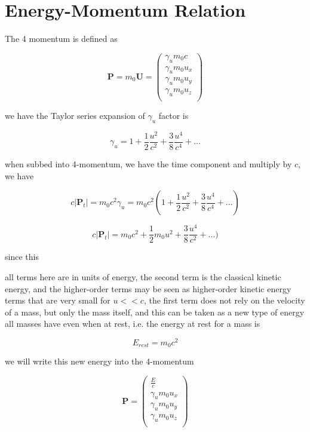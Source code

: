 \section{Energy-Momentum Relation}

The 4 momentum is defined as

\begin{equation}
	\mathbf{P} = m_0 \mathbf{U} =
	\begin{pmatrix}
		\gamma_u m_0 c   \\
		\gamma_u m_0 u_x \\
		\gamma_u m_0 u_y \\
		\gamma_u m_0 u_z \\
	\end{pmatrix}
\end{equation}

we have the Taylor series expansion of $\gamma_u$ factor is

\begin{equation}
	\gamma_u = 1 + \frac{1}{2}\frac{u^2}{c^2} + \frac{3}{8}\frac{u^4}{c^4} + ...
\end{equation}

when subbed into 4-momentum, we have the time component and multiply by $c$, we have

\begin{equation}
	c |\mathbf{P}_t| = m_0 c^2\gamma_u = m_0 c^2 ( 1 + \frac{1}{2}\frac{u^2}{c^2} +\frac{3}{8}\frac{u^4}{c^4} + ... )
\end{equation}

\begin{equation}
	c |\mathbf{P}_t| = m_0 c^2 + \frac{1}{2} m_0 u^2 + \frac{3}{8}\frac{u^4}{c^2} + ... )
\end{equation}

since this

all terms here are in units of energy, the second term is the classical kinetic energy, and the higher-order terms may be seen as higher-order kinetic energy terms that are very small for $u<<c$, the first term does not rely on the velocity of a mass, but only the mass itself, and this can be taken as a new type of energy all masses have even when at rest, i.e. the energy at rest for a mass is

\begin{equation}
	E_{rest} = m_0 c^2
\end{equation}

we will write this new energy into the 4-momentum

\begin{equation}
	\mathbf{P} =
	\begin{pmatrix}
		\frac{E}{c}      \\
		\gamma_u m_0 u_x \\
		\gamma_u m_0 u_y \\
		\gamma_u m_0 u_z \\
	\end{pmatrix}
\end{equation}

